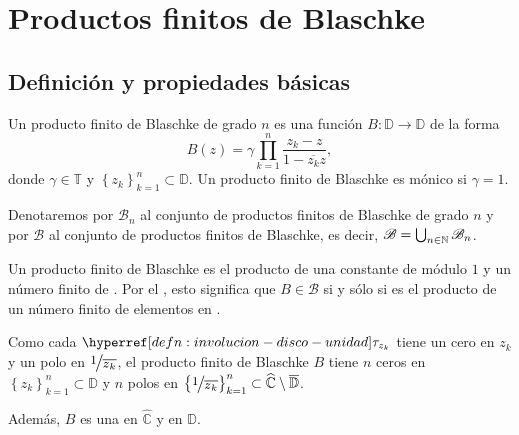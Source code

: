 \chapter{Productos finitos de Blaschke}

\section{Definición y propiedades básicas}

\begin{defn}\label{defn:producto-finito-blaschke}
    Un producto finito de Blaschke de grado $n$ es una función $B \colon \mathbb{D} \to \mathbb{D}$ de la forma
    \[
    B(z) = \gamma \prod_{k=1}^n \frac{z_k - z}{1 - \overline{z_k} z}, 
    \]
    donde $\gamma \in \mathbb{T}$ y $\left\{z_k\right\}_{k=1}^n \subset \mathbb{D}$.
    Un producto finito de Blaschke es mónico si $\gamma = 1$.

    Denotaremos por $\mathscr{B}_n$ al conjunto de productos finitos de Blaschke de grado $n$ y por $\mathscr{B}$ al conjunto de productos finitos de Blaschke, es decir, $\mathscr{B} = \bigcup_{n \in \mathbb{N}} \mathscr{B}_n$.
\end{defn}

Un producto finito de Blaschke es el producto de una constante de módulo $1$ y un número finito de . Por el , esto significa que $B \in \mathscr{B}$ si y sólo si es el producto de un número finito de elementos en .

Como cada $\exhyperref[defn:involucion-disco-unidad]{involucion-disco-unidad}{\tau_{z_k}}$ tiene un cero en $z_k$ y un polo en $\sfrac{1}{\bar{z_k}}$, el producto finito de Blaschke $B$ tiene $n$ ceros en $\left\{z_k\right\}_{k=1}^n \subset \mathbb{D}$ y $n$ polos en $\left\{\sfrac{1}{\bar{z_k}}\right\}_{k=1}^n \subset \widehat{\mathbb{C}} \setminus \bar{\mathbb{D}}$.

Además, $B$ es una  en $\widehat{\mathbb{C}}$ y  en $\mathbb{D}$.

